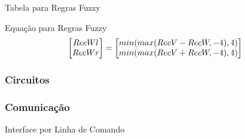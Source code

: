 \begin{frame}
	
\end{frame}

\begin{frame}
	
\end{frame}

\begin{frame}
	
\end{frame}

\begin{frame}
	
\end{frame}

\begin{frame}
	\begin{block}{Tabela para Regras Fuzzy}
		
	\end{block}
\end{frame}

\begin{frame}
	\begin{block}{Equação para Regras Fuzzy}
		\begin{equation}
				\mleft[
				\begin{matrix}
			  		RecWl\\
			  		RecWr\\
				\end{matrix}
				\mright] = \mleft[
				\begin{matrix}
			  		min(max(RecV - RecW,-4),4) \\
			  		min(max(RecV + RecW,-4),4) \\
				\end{matrix}
				\mright]
		\end{equation}
	\end{block}
\end{frame}

\begin{frame}
	\frametitle{Circuitos}
	
\end{frame}

\begin{frame}
	
\end{frame}
	
\begin{frame}
	\frametitle{Comunicação}
	\begin{block}{Interface por Linha de Comando}
			
	\end{block}
\end{frame}

